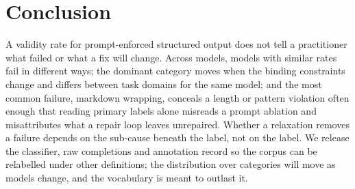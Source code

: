 \section{Conclusion}
\label{sec:conclusion}

A validity rate for prompt-enforced structured output does not tell a
practitioner what failed or what a fix will change. Across
 models, models with similar rates fail in different
ways; the dominant category moves when the binding constraints change and
differs between task domains for the same model; and the most common
failure, markdown wrapping, conceals a length or pattern violation often
enough that reading primary labels alone misreads a prompt ablation and
misattributes what a repair loop leaves unrepaired. Whether a relaxation
removes a failure depends on the sub-cause beneath the label, not on the
label. We release the classifier, raw completions and annotation record
so the corpus can be relabelled under other definitions; the distribution
over categories will move as models change, and the vocabulary is meant
to outlast it.
